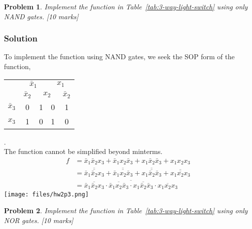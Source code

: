 \documentclass[twocolumn]{article}
\newtheorem{prob}{Problem}
\newcommand{\bx}{\bar{x}}
\begin{document}
\begin{prob}
 Implement the function in Table~\ref{tab:3-way-light-switch} using only NAND
 gates. [10 marks]
\end{prob}
\subsubsection*{Solution}
To implement the function using NAND gates, we seek the SOP form of the
function,
\\
\begin{tabular}{c|c|c|c|c}
  \toprule
  & \multicolumn{2}{c|}{$\bx_1$} & \multicolumn{2}{c}{$x_1$}
  \\
  & $\bx_2$ & \multicolumn{2}{c|}{$x_2$} & $\bx_2$
  \\ \midrule
  $\bx_3$
  & 0 & 1 & 0 & 1
  \\
  $x_3$
  & 1 & 0 & 1 & 0
  \\\bottomrule
\end{tabular}.
\\
The function cannot be simplified beyond minterms.
\begin{align*}
  f &= \bx_1 \bx_2 x_3 + \bx_1 x_2 \bx_3 + x_1 \bx_2 \bx_3 + x_1 x_2 x_3
  \\
    &= \overline{\overline{\bx_1 \bx_2 x_3}} + \overline{\overline{\bx_1 x_2 \bx_3}} + \overline{\overline{x_1 \bx_2 \bx_3}} + \overline{\overline{x_1 x_2 x_3}}
  \\
    &= \overline{\overline{\bx_1 \bx_2 x_3} \cdot {\overline{\bx_1 x_2 \bx_3}} \cdot {\overline{x_1 \bx_2 \bx_3}} \cdot {\overline{x_1 x_2 x_3}}}
\end{align*}
\texttt{[image: files/hw2p3.png]}

\begin{prob}
 Implement the function in Table~\ref{tab:3-way-light-switch} using only NOR
 gates. [10 marks]
\end{prob}
\end{document}
